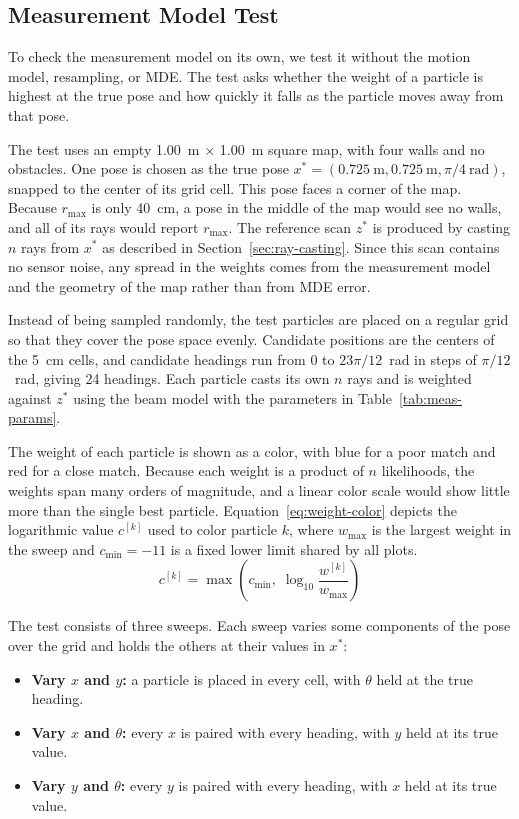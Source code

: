 \subsection{Measurement Model Test}
\label{sec:measurement-test}

To check the measurement model on its own, we test it without the motion model, resampling, or
MDE. The test asks whether the weight of a particle is highest at the true pose and how quickly
it falls as the particle moves away from that pose.

The test uses an empty 1.00~m $\times$ 1.00~m square map, with four walls and no obstacles.
One pose is chosen as the true pose $x^{*} = (0.725~\text{m}, 0.725~\text{m}, \pi/4~\text{rad})$,
snapped to the center of its grid cell. This pose faces a corner of the map. Because
$r_{\max}$ is only 40~cm, a pose in the middle of the map would see no walls, and all of its
rays would report $r_{\max}$. The reference scan $z^{*}$ is produced by casting $n$ rays from
$x^{*}$ as described in Section~\ref{sec:ray-casting}. Since this scan contains no sensor noise,
any spread in the weights comes from the measurement model and the geometry of the map rather than
from MDE error.

Instead of being sampled randomly, the test particles are placed on a regular grid so that they
cover the pose space evenly. Candidate positions are the centers of the 5~cm cells, and
candidate headings run from $0$ to $23\pi/12$~rad in steps of $\pi/12$~rad, giving 24 headings.
Each particle casts its own $n$ rays and is weighted against $z^{*}$ using the beam model with the
parameters in Table~\ref{tab:meas-params}. 

The weight of each particle is shown as a color, with blue for a poor match and red for a close
match. Because each weight is a product of $n$ likelihoods, the weights span many orders of
magnitude, and a linear color scale would show little more than the single best particle.
Equation~\ref{eq:weight-color} depicts the logarithmic value $c^{[k]}$ used to color particle $k$,
where $w_{\max}$ is the largest weight in the sweep and $c_{\min} = -11$ is a fixed lower
limit shared by all plots.
\begin{equation}
  \label{eq:weight-color}
  c^{[k]} = \max\!\left( c_{\min},\; \log_{10} \frac{w^{[k]}}{w_{\max}} \right)
\end{equation}

The test consists of three sweeps. Each sweep varies some components of the pose over the grid
and holds the others at their values in $x^{*}$:
\begin{itemize}
  \item \textbf{Vary $x$ and $y$:} a particle is placed in every cell, with $\theta$ held at the
    true heading.
  \item \textbf{Vary $x$ and $\theta$:} every $x$ is paired with every heading, with $y$ held at
    its true value.
  \item \textbf{Vary $y$ and $\theta$:} every $y$ is paired with every heading, with $x$ held at
    its true value.
\end{itemize}

